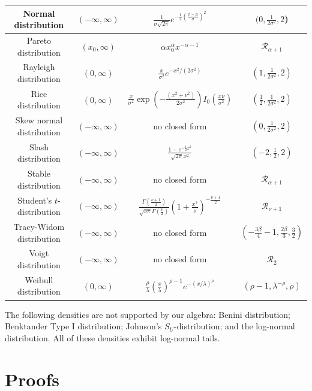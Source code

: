 \documentclass{article}
\theoremstyle{definition}
\begin{document}
\begin{longtable}{|c|c|c|c|}
Normal distribution & $(-\infty,\infty)$ & $\frac{1}{\sigma\sqrt{2\pi}}e^{-\frac{1}{2}(\frac{x-\mu}{\sigma})^{2}}$ & $(0,\frac{1}{2\sigma^{2}},2$)\tabularnewline
\hline 
Pareto distribution & $(x_{0},\infty)$ & $\alpha x_{0}^{\alpha}x^{-\alpha-1}$ & $\mathcal{R}_{\alpha+1}$\tabularnewline
\hline 
Rayleigh distribution & $(0,\infty)$ & $\frac{x}{\sigma^{2}}e^{-x^{2}/(2\sigma^{2})}$ & $(1,\frac{1}{2\sigma^{2}},2)$\tabularnewline
\hline 
Rice distribution & $(0,\infty)$ & $\frac{x}{\sigma^{2}}\exp\left(-\frac{(x^{2}+\nu^{2})}{2\sigma^{2}}\right)I_{0}\left(\frac{x\nu}{\sigma^{2}}\right)$ & $(\frac{1}{2},\frac{1}{2\sigma^{2}},2)$\tabularnewline
\hline 
Skew normal distribution & $(-\infty,\infty)$ & no closed form & $(0,\frac{1}{2\sigma^{2}},2)$\tabularnewline
\hline 
Slash distribution & $(-\infty,\infty)$ & $\frac{1-e^{-\frac{1}{2}x^{2}}}{\sqrt{2\pi}x^{2}}$ & $(-2,\frac{1}{2},2)$\tabularnewline
\hline 
Stable distribution & $(-\infty,\infty)$ & no closed form & $\mathcal{R}_{\alpha+1}$\tabularnewline
\hline 
Student's $t$-distribution & $(-\infty,\infty)$ & $\frac{\Gamma(\frac{\nu+1}{2})}{\sqrt{\nu\pi}\Gamma(\frac{\nu}{2})}\left(1+\frac{x^{2}}{\nu}\right)^{-\frac{\nu+1}{2}}$ & $\mathcal{R}_{\nu+1}$\tabularnewline
\hline 
Tracy-Widom distribution & $(-\infty,\infty)$ & no closed form & $(-\frac{3\beta}{4}-1,\frac{2\beta}{3},\frac{3}{2})$\tabularnewline
\hline 
Voigt distribution & $(-\infty,\infty)$ & no closed form & $\mathcal{R}_{2}$\tabularnewline
\hline 
Weibull distribution & $(0,\infty)$ & $\frac{\rho}{\lambda}\left(\frac{x}{\lambda}\right)^{\rho-1}e^{-(x/\lambda)^{\rho}}$ & $(\rho-1,\lambda^{-\rho},\rho)$\tabularnewline
\hline 
\end{longtable}
\egroup

The following densities are not supported by our algebra: Benini distribution; Benktander Type I distribution; Johnson's $S_U$-distribution; and the log-normal distribution. All of these densities exhibit log-normal tails.

\section{Proofs}\label{sec:proofs}
\end{document}

